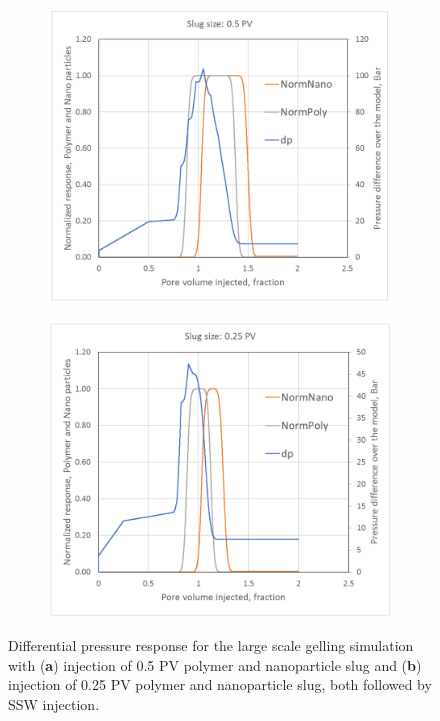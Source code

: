 \documentclass[nanomaterials,article,submit,moreauthors,pdftex]{Definitions/mdpi}
\begin{document}
\begin{figure}[h!] %
    \centering
    \begin{subfigure}[b]{.49\textwidth}
    \includegraphics[width=\textwidth]{fig/pDiff1.png}
    \caption{}
    \label{cht:pDiff1}
    \end{subfigure}
    \begin{subfigure}[b]{.49\textwidth}
    \includegraphics[width=\textwidth]{fig/pDiff2.png}
    \caption{}
    \label{cht:pDiff2}
    \end{subfigure}
    
    \caption{Differential pressure response for the large scale gelling simulation with (\textbf{a}) injection of 0.5 PV polymer and nanoparticle slug and (\textbf{b}) injection of 0.25 PV polymer and nanoparticle slug, both followed by SSW injection. }
    \label{cht:pDiff}
\end{figure}
\end{document}
